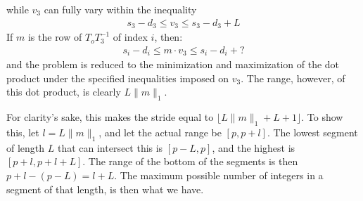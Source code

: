 \documentclass[a4paper]{article}
\begin{document}
  while $v_3$ can fully vary within the inequality
  \begin{gather*}
    s_3-d_3\le v_3\le s_3-d_3+L
  \end{gather*}
  If $m$ is the row of $T_{o}T_3^{-1}$ of index $i$, then:
  \begin{gather*}
    s_{i}-d_{i}\le m\cdot v_3\le s_{i}-d_{i}+?
  \end{gather*}
  and the problem is reduced to the minimization and maximization of the dot product under
  the specified inequalities imposed on $v_3$. The range, however, of this dot product, is clearly
  $L\lVert m\rVert_{1}$.

  For clarity's sake, this makes the stride equal to $\lfloor L\lVert m\rVert_{1}+L+1\rfloor$.
  To show this, let $l=L\lVert m\rVert_{1}$, and let the actual range be $[p,p+l]$.
  The lowest segment of length $L$ that can intersect this is $[p-L,p]$, and the highest is
  $[p+l,p+l+L]$. The range of the bottom of the segments is then $p+l-(p-L)=l+L$. The maximum possible
  number of integers in a segment of that length, is then what we have.
\end{document}
